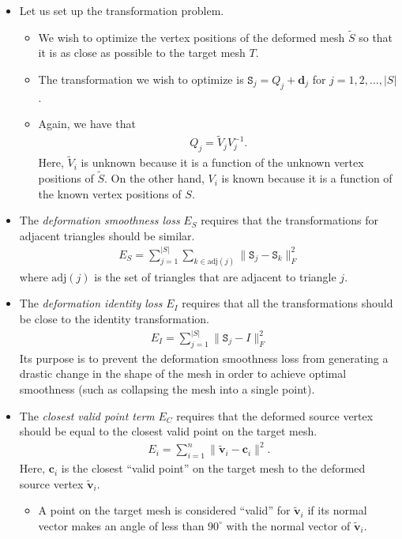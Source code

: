\documentclass[10pt]{article}
\newcommand{\ve}[1]{\mathbf{#1}}
\newcommand{\mtt}[1]{\mathtt{#1}}
\begin{document}
\begin{itemize}
    \item Let us set up the transformation problem.
    \begin{itemize}
        \item We wish to optimize the vertex positions of the deformed mesh $\widetilde{S}$ so that it is as close as possible to the target mesh $T$.
        \item The transformation we wish to optimize is $\mtt{S}_j = Q_j + \ve{d}_j$ for $j = 1, 2, \ldots, |S|$.
        \item Again, we have that
        \begin{align*}
            Q_j = \widetilde{V}_j V_j^{-1}.
        \end{align*}
        Here, $\widetilde{V}_i$ is unknown because it is a function of the unknown vertex positions of $\widetilde{S}$. On the other hand, $V_i$ is known because it is a function of the known vertex positions of $S$.
    \end{itemize}

    \item The \emph{deformation smoothness loss} $E_S$ requires that the transformations for adjacent triangles should be similar.
    \begin{align*}
        E_S = \sum_{j=1}^{|S|} \sum_{k \in \mathrm{adj}(j)} \| \mtt{S}_j - \mtt{S}_k \|^2_F
    \end{align*}
    where $\mathrm{adj}(j)$ is the set of triangles that are adjacent to triangle $j$.    

    \item The \emph{deformation identity loss} $E_I$ requires that all the transformations should be close to the identity transformation.
    \begin{align*}
        E_I = \sum_{j=1}^{|S|} \| \mtt{S}_j - I \|^2_F
    \end{align*}
    Its purpose is to prevent the deformation smoothness loss from generating a drastic change in the shape of the mesh in order to achieve optimal smoothness (such as collapsing the mesh into a single point).

    \item The \emph{closest valid point term} $E_C$ requires that the deformed source vertex should be equal to the closest valid point on the target mesh.
    \begin{align*}
        E_i = \sum_{i=1}^n \| \widetilde{\ve{v}}_i - \ve{c}_i \|^2.
    \end{align*}
    Here, $\ve{c}_i$ is the closest ``valid point'' on the target mesh to the deformed source vertex $\widetilde{\ve{v}}_i$.
    \begin{itemize}
        \item A point on the target mesh is considered ``valid'' for $\widetilde{\ve{v}}_i$ if its normal vector makes an angle of less than $90^\circ$ with the normal vector of $\widetilde{\ve{v}}_i$.
        

\end{itemize}
\end{itemize}
\end{document}
